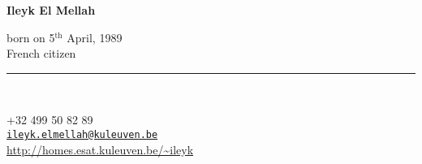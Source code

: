 \documentclass[a4paper,oneside]{cv}
\newcommand{\ligne}[1]{\rule[0.5ex]{\textwidth}{#1}\\}
\begin{document}
\vspace*{-1cm}
\begin{chapeau}
\begin{flushright}
\begin{adresse}
	\begin{Large}
	\textbf{Ileyk El Mellah}\\%
	\end{Large}	
	\begin{large}
	born on 5$^{\text{th}}$ April, 1989\\%
	French citizen\\%
	\end{large}
	\ligne\\%
	\begin{large}
	+32 499 50 82 89\\%
	\texttt{\href{mailto:ileyk.elmellah@kuleuven.be}{ileyk.elmellah@kuleuven.be}}\\
	\href{http://homes.esat.kuleuven.be/~ileyk}{http://homes.esat.kuleuven.be/\textasciitilde ileyk}\\
	\end{large}
\end{adresse}
\end{flushright}
\end{chapeau}
\vspace*{-2.5cm}
\\ \\ \\ \\ \\ \\
\end{document}

